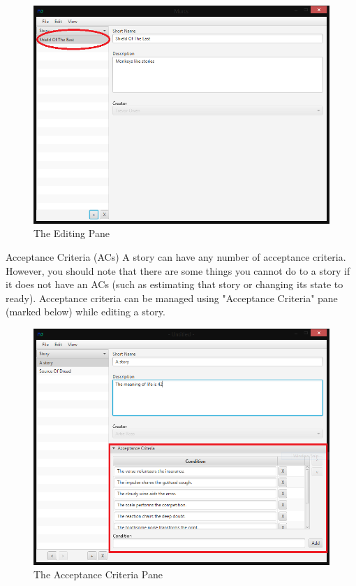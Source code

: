 \begin{figure}[H]
\centering
\includegraphics[width=\textwidth]{images/screenshots/stories4.PNG}
\caption{The Editing Pane}
\label{fig:new_project}
\end{figure}

Acceptance Criteria (ACs)\newline
A story can have any number of acceptance criteria. However, you should note that there are some things you cannot do to a story if it does not have an ACs (such as estimating that story or changing its state to ready). Acceptance criteria can be managed using "Acceptance Criteria" pane (marked below) while editing a story.

\begin{figure}[H]
\centering
\includegraphics[width=\textwidth]{images/screenshots/AcceptanceCriteria1.PNG}
\caption{The Acceptance Criteria Pane}
\label{fig:new_project}
\end{figure}

